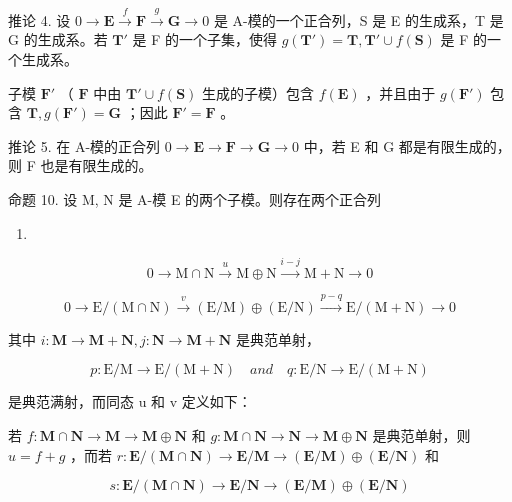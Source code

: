 推论 4. 设 \(0 \to \mathbf{E} \xrightarrow{f} \mathbf{F} \xrightarrow{g} \mathbf{G} \to 0\) 是 A-模的一个正合列，S 是 E 的生成系，T 是 G 的生成系。若 \(\mathbf{T}'\) 是 F 的一个子集，使得 \(g(\mathbf{T}') = \mathbf{T}, \mathbf{T}' \cup f(\mathbf{S})\) 是 F 的一个生成系。

子模 \(\mathbf{F}'\) （ \(\mathbf{F}\) 中由 \(\mathbf{T}' \cup f(\mathbf{S})\) 生成的子模）包含 \(f(\mathbf{E})\) ，并且由于 \(g(\mathbf{F}')\) 包含 \(\mathbf{T}, g(\mathbf{F}') = \mathbf{G}\) ；因此 \(\mathbf{F}' = \mathbf{F}\) 。

推论 5. 在 A-模的正合列 \(0 \to \mathbf{E} \to \mathbf{F} \to \mathbf{G} \to 0\) 中，若 E 和 G 都是有限生成的，则 F 也是有限生成的。

命题 10. 设 M, N 是 A-模 E 的两个子模。则存在两个正合列

\begin{enumerate}
\def\labelenumi{(\arabic{enumi})}
\setcounter{enumi}{28}
\tightlist
\item
\end{enumerate}

\[
0 \longrightarrow \mathrm{M} \cap \mathrm{N} \stackrel {u} {\longrightarrow} \mathrm{M} \oplus \mathrm{N} \stackrel {i - j} {\longrightarrow} \mathrm{M} + \mathrm{N} \longrightarrow 0\tag{30}
\]

\[
0 \longrightarrow \mathrm{E} / (\mathrm{M} \cap \mathrm{N}) \stackrel {v} {\longrightarrow} (\mathrm{E} / \mathrm{M}) \oplus (\mathrm{E} / \mathrm{N}) \stackrel {p - q} {\longrightarrow} \mathrm{E} / (\mathrm{M} + \mathrm{N}) \longrightarrow 0
\]

其中 \(i:\mathbf{M}\to \mathbf{M} + \mathbf{N},j:\mathbf{N}\rightarrow \mathbf{M} + \mathbf{N}\) 是典范单射，

\[
p: \mathrm{E} / \mathrm{M} \rightarrow \mathrm{E} / (\mathrm{M} + \mathrm{N}) \quad and \quad q: \mathrm{E} / \mathrm{N} \rightarrow \mathrm{E} / (\mathrm{M} + \mathrm{N})
\]

是典范满射，而同态 u 和 v 定义如下：

若 \(f: \mathbf{M} \cap \mathbf{N} \to \mathbf{M} \to \mathbf{M} \oplus \mathbf{N}\) 和 \(g: \mathbf{M} \cap \mathbf{N} \to \mathbf{N} \to \mathbf{M} \oplus \mathbf{N}\) 是典范单射，则 \(u = f + g\) ，而若 \(r: \mathbf{E}/(\mathbf{M} \cap \mathbf{N}) \to \mathbf{E}/\mathbf{M} \to (\mathbf{E}/\mathbf{M}) \oplus (\mathbf{E}/\mathbf{N})\) 和

\[
s: \mathbf {E} / (\mathbf {M} \cap \mathbf {N}) \rightarrow \mathbf {E} / \mathbf {N} \rightarrow (\mathbf {E} / \mathbf {M}) \oplus (\mathbf {E} / \mathbf {N})
\]

